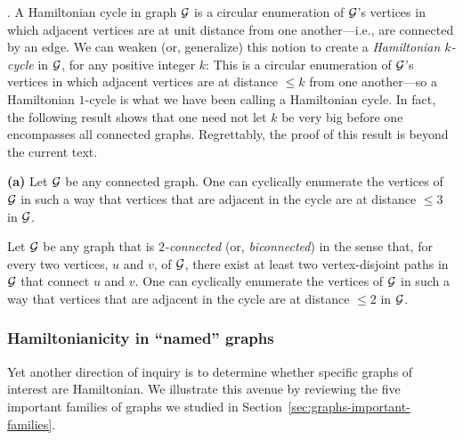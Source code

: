.
A Hamiltonian cycle in graph $\mbox{$\cal G$}$ is a circular enumeration of $\mbox{$\cal G$}$'s
vertices in which adjacent vertices are at unit distance from one
another---i.e., are connected by an edge.  We can weaken (or,
generalize) this notion to create a {\it Hamiltonian $k$-cycle}
 in $\mbox{$\cal G$}$, for any positive integer
$k$: This is a circular enumeration of $\mbox{$\cal G$}$'s vertices in which adjacent
vertices are at distance $\leq k$ from one another---so a Hamiltonian
$1$-cycle is what we have been calling a Hamiltonian cycle.  In fact,
the following result shows that one need not let $k$ be very big
before one encompasses all connected graphs.  Regrettably, the proof
of this result is beyond the current text.

\begin{prop}
\label{thm:weak-Hamiltonianicity}
{\bf (a)} {\rm \cite{ChartrandK69}}
Let $\mbox{$\cal G$}$ be any connected graph.  One can cyclically enumerate the
vertices of $\mbox{$\cal G$}$ in such a way that vertices that are adjacent in the cycle
are at distance $\leq 3$ in $\mbox{$\cal G$}$.

 

 {\rm  \cite{Fleischner74}}
Let $\mbox{$\cal G$}$ be any graph that is {\em $2$-connected} (or, {\it biconnected}) in the sense 
that, for every two vertices, $u$ and $v$, of $\mbox{$\cal G$}$, there exist at least two vertex-disjoint 
paths in $\mbox{$\cal G$}$ that connect $u$ and $v$.  One can cyclically enumerate the vertices of
$\mbox{$\cal G$}$ in such a way that vertices that are adjacent in the cycle are at distance $\leq 2$ in $\mbox{$\cal G$}$.
\end{prop}

\subsubsection{Hamiltonianicity in ``named'' graphs}
\label{sec:hamiltonian-named-graphs}

Yet another direction of inquiry is to determine whether specific
graphs of interest are Hamiltonian.  We illustrate this avenue by
reviewing the five important families of graphs we studied in
Section~\ref{sec:graphs-important-families}.

